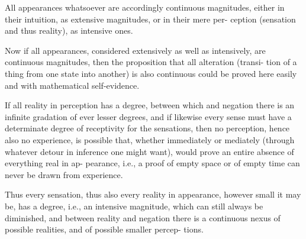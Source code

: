 All appearances whatsoever are accordingly continuous magnitudes,
either in their intuition, as extensive magnitudes, or in their mere per-
ception (sensation and thus reality), as intensive ones.

Now if all appearances, considered extensively as well as intensively, are
continuous magnitudes, then the proposition that all alteration (transi-
tion of a thing from one state into another) is also continuous could be
proved here easily and with mathematical self-evidence.

If all reality in perception has a degree, between which and negation
there is an infinite gradation of ever lesser degrees, and if likewise every
sense must have a determinate degree of receptivity for the sensations,
then no perception, hence also no experience, is possible that, whether
immediately or mediately (through whatever detour in inference one
might want), would prove an entire absence of everything real in ap-
pearance, i.e., a proof of empty space or of empty time can never be
drawn from experience.

Thus every sensation, thus also every reality in appearance, however
small it may be, has a degree, i.e., an intensive magnitude, which can
still always be diminished, and between reality and negation there is a
continuous nexus of possible realities, and of possible smaller percep-
tions.


